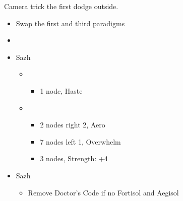 Camera trick the first dodge outside.
\vfill
	\begin{menu}
		\begin{itemize}
			\paradigm
			\begin{itemize}
				\item Swap the first and third paradigms
				\item {}%
				      {\paradigmline[1]{\textit{\syn}}{\textit{\sab}}{}}%
				      {\paradigmline{\com}{\med}{}}%
				      {\paradigmline{\com}{\rav}{}}%
				      {\paradigmline{\rav}{\rav}{}}%
				      {\paradigmline{[\rav]}{\sab}{}}%
				      {\paradigmline{[\com]}{\sab}{}}
			\end{itemize}
			\crystarium
			\begin{itemize}
				\item Sazh
				      \begin{itemize}
					      \item \syn
					            \begin{itemize}
						            \item 1 node, Haste
					            \end{itemize}
					      \item \rav
					            \begin{itemize}
						            \item 2 nodes right 2, Aero
						            \item 7 nodes left 1, Overwhelm
						            \item 3 nodes, Strength: +4
					            \end{itemize}
				      \end{itemize}
			\end{itemize}
			\equip
			\begin{itemize}
				\item Sazh
				      \begin{itemize}
					      \item Remove Doctor's Code if no Fortisol and Aegisol
				      \end{itemize}
			\end{itemize}
		\end{itemize}
	\end{menu}

